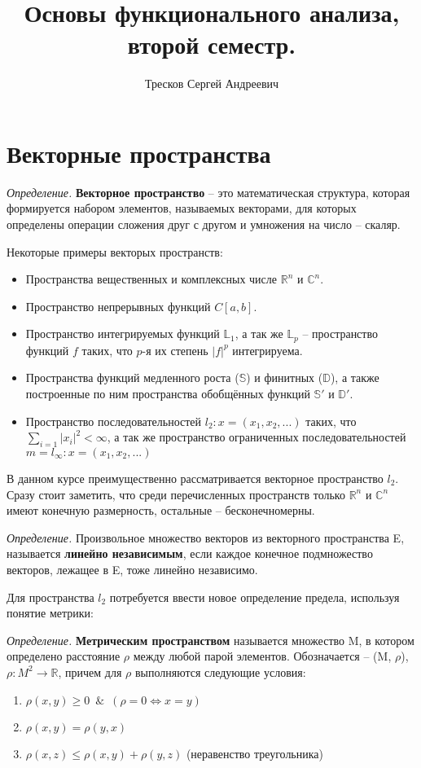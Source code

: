 \documentclass[12pt]{article}
\newcommand{\equals}{\Leftrightarrow}
\newcommand{\defi}{{\itshape Определение. }}
\renewcommand{\leq}{\leqslant}
\renewcommand{\geq}{\geqslant}
\begin{document}
	\title{Основы функционального анализа, второй семестр.}
	\author{Тресков Сергей Андреевич}
	\maketitle
	
	\section{Векторные пространства}
	
	\defi \textbf{Векторное пространство} -- это математическая структура, которая формируется набором элементов, называемых векторами, для которых определены операции сложения друг с другом и умножения на число -- скаляр.

	Некоторые примеры векторых пространств:
		\begin{itemize}
			\item Пространства вещественных и комплексных числе $\mathbb{R}^n$ и $\mathbb{C}^n$.
			\item Пространство непрерывных функций $C[a,b]$.
			\item Пространство интегрируемых функций $\mathbb{L}_1$, а так же $\mathbb{L}_p$ -- пространство функций $f$ таких, что $p$-я их степень $|f|^p$ интегрируема.
			\item Пространства функций медленного роста ($\mathbb{S}$) и финитных ($\mathbb{D}$), а также построенные по ним пространства обобщённых функций $\mathbb{S}'$ и $\mathbb{D}'$.
			\item Пространство последовательностей $l_2 : x = (x_1, x_2, ...)$ таких, что $\sum_{i=1} |x_i|^2 < \infty$, а так же пространство ограниченных последовательностей $m = l_\infty : x = (x_1, x_2, ...)$
		\end{itemize}

	В данном курсе преимущественно рассматривается векторное пространство $l_2$. Сразу стоит заметить, что среди перечисленных пространств только $\mathbb{R}^n$ и $\mathbb{C}^n$ имеют конечную размерность, остальные -- бесконечномерны.
	
	\defi Произвольное множество векторов из векторного пространства E, называется \textbf{линейно независимым}, если каждое конечное
	подмножество векторов, лежащее в E, тоже линейно независимо.
	
	Для пространства $l_2$ потребуется ввести новое определение предела, используя понятие метрики:
	
	\defi \textbf{Метрическим пространством} называется множество M, в котором определено расстояние $\rho$ между любой парой элементов. Обозначается -- (M, $\rho$), $\rho : M^2 \rightarrow 
	\mathbb{R}$, причем для $\rho$ выполняются следующие условия:
	\begin{enumerate}
		\item $\rho(x,y) \geq 0$~$\&$~$(\rho = 0 \equals x=y)$
		\item $\rho(x,y) = \rho(y,x)$
		\item $\rho(x,z) \leq \rho(x,y) + \rho(y,z)$ (неравенство треугольника)
	\end{enumerate}
	
\end{document}
